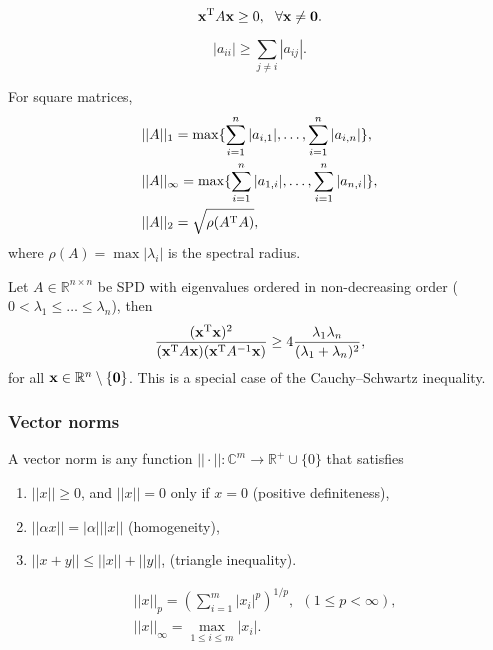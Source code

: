 \documentclass{article}
\begin{document}
\begin{definition}[Definiteness]
    \begin{equation}
        \bvec{x}\tp A\bvec{x}\geq 0,\ \ \forall\bvec{x}\neq\bvec{0}.
    \end{equation}
\end{definition}

\begin{definition}
    \begin{equation}
        |a_{ii}|\geq{\sum_{j\neq i}}|a_{ij}|.
    \end{equation}
\end{definition}

\begin{definition}
For square matrices,
\begin{align}
    &||A||_1=\max\{ \sum_{i=1}^n|a_{i,1}|,\dots, \sum_{i=1}^n|a_{i,n}|\},\\
    &||A||_{\infty}=\max\{ \sum_{i=1}^n|a_{1,i}|,\dots, \sum_{i=1}^n|a_{n,i}|\},\\
    &||A||_2=\sqrt{\rho(A^{\text{T}} A)},
\end{align}
where $\rho(A)=\max|\lambda_i|$ is the spectral radius.
\end{definition}

\begin{theorem}
Let $A\in\mathbb{R}^{n\times n}$ be SPD with eigenvalues ordered in non-decreasing order ($0<\lambda_1\leq\dots\leq\lambda_n$), then
\begin{equation}
    \frac{(\bm{\mathrm{x}}^{\text{T}} \bm{\mathrm{x}})^2}{(\bm{\mathrm{x}}^{\text{T}} A\bm{\mathrm{x}})(\bm{\mathrm{x}}^{\text{T}} A^{-1}\bm{\mathrm{x}})}\geq 4\frac{\lambda_1\lambda_n}{(\lambda_1+\lambda_n)^2},
\end{equation}
for all $\bm{\mathrm{x}}\in\mathbb{R}^n\setminus\{\bm{\mathrm{0}}\}$. This is a special case of the Cauchy--Schwartz inequality.
\end{theorem}

\subsubsection{Vector norms}
A vector norm is any function $||\cdot||:\mathbb{C}^m\rightarrow\mathbb{R}^+\cup \{0\}$ that satisfies
\begin{enumerate}
    \item $||x||\geq 0$, and $||x||=0$ only if $x=0$ (positive definiteness),
    \item $||\alpha x||=|\alpha|||x||$ (homogeneity),
    \item $||x+y||\leq||x||+||y||$, (triangle inequality).
\end{enumerate}
\begin{definition}
    \begin{align}
        &||x||_p=\left( \sum_{i=1}^m|x_i|^p \right)^{1/p},\ \ (1\leq p<\infty),\\
        &||x||_{\infty}=\max_{1\leq i\leq m}|x_i|.
    \end{align}
\end{definition}
\end{document}
